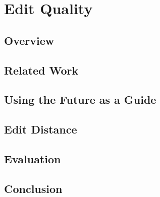 \chapter{Edit Quality}
\label{ch:editquality}

    \section{Overview}
    \section{Related Work}
    \section{Using the Future as a Guide}
    \section{Edit Distance}
    \section{Evaluation}
    \section{Conclusion}

